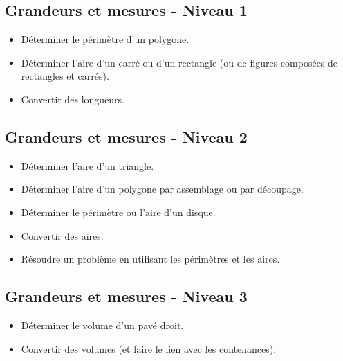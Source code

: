 \documentclass[a4paper,12pt,fleqn]{article}
\begin{document}
\renewcommand{\labelitemi}{}

\subsection*{Grandeurs et mesures - Niveau 1}

\begin{itemize}
	\item {}Déterminer le périmètre d’un polygone.
	\item {}Déterminer l’aire d’un carré ou d’un rectangle (ou de figures composées de rectangles et carrés).
	\item {}Convertir des longueurs.
\end{itemize}

\subsection*{Grandeurs et mesures - Niveau 2}

\begin{itemize}
	\item {}Déterminer l’aire d’un triangle.
	\item {}Déterminer l’aire d’un polygone par assemblage ou par découpage.
	\item {}Déterminer le périmètre ou l’aire d’un disque.
	\item {}Convertir des aires.
	\item {}Résoudre un problème en utilisant les périmètres et les aires.


\end{itemize}

\subsection*{Grandeurs et mesures - Niveau 3}

\begin{itemize}
	\item {}Déterminer le volume d’un pavé droit.
	\item {}Convertir des volumes (et faire le lien avec les contenances).
\end{itemize}
	
\end{document}
